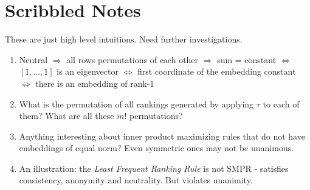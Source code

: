 \documentclass[10pt,letterpaper]{article}
\begin{document}
\section{Scribbled Notes}
These are just high level intuitions. Need further investigations.
\begin{enumerate}
\item Neutral $\Rightarrow$ all rows permutations of each other $\Rightarrow$ sum = constant $\Leftrightarrow$ $[1,\ldots,1]$ is an eigenvector $\Leftrightarrow$ first coordinate of the embedding constant $\Leftrightarrow$ there is an embedding of rank-1

\item What is the permutation of all rankings generated by applying $\tau$ to each of them? What are all these $m!$ permutations?

\item Anything interesting about inner product maximizing rules that do not have embeddings of equal norm? Even symmetric ones may not be unanimous. 

\item An illustration: the \emph{Least Frequent Ranking Rule} is not SMPR - satisfies consistency, anonymity and neutrality. But violates unanimity. 
\end{enumerate}

\end{document}
